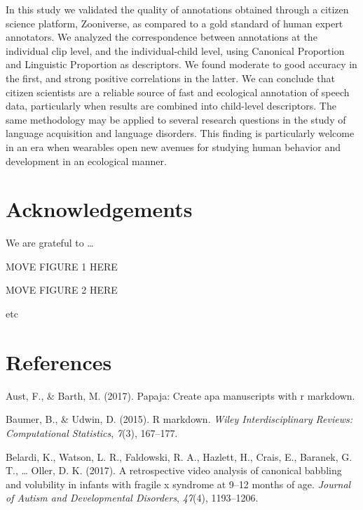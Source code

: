 \documentclass[english,,man,floatsintext]{apa6}
\begin{document}
In this study we validated the quality of annotations obtained through a citizen science platform, Zooniverse, as compared to a gold standard of human expert annotators. We analyzed the correspondence between annotations at the individual clip level, and the individual-child level, using Canonical Proportion and Linguistic Proportion as descriptors. We found moderate to good accuracy in the first, and strong positive correlations in the latter. We can conclude that citizen scientists are a reliable source of fast and ecological annotation of speech data, particularly when results are combined into child-level descriptors. The same methodology may be applied to several research questions in the study of language acquisition and language disorders. This finding is particularly welcome in an era when wearables open new avenues for studying human behavior and development in an ecological manner.

\newpage

\hypertarget{acknowledgements}{%
\section{Acknowledgements}\label{acknowledgements}}

We are grateful to \ldots{}

\newpage

MOVE FIGURE 1 HERE

\newpage

MOVE FIGURE 2 HERE

etc

\hypertarget{references}{%
\section{References}\label{references}}

\setlength{\parindent}{-0.5in}
\setlength{\leftskip}{0.5in}

\hypertarget{refs}{}
\leavevmode\hypertarget{ref-aust2017papaja}{}%
Aust, F., \& Barth, M. (2017). Papaja: Create apa manuscripts with r markdown.

\leavevmode\hypertarget{ref-baumer2015r}{}%
Baumer, B., \& Udwin, D. (2015). R markdown. \emph{Wiley Interdisciplinary Reviews: Computational Statistics}, \emph{7}(3), 167--177.

\leavevmode\hypertarget{ref-belardi2017retrospective}{}%
Belardi, K., Watson, L. R., Faldowski, R. A., Hazlett, H., Crais, E., Baranek, G. T., \ldots{} Oller, D. K. (2017). A retrospective video analysis of canonical babbling and volubility in infants with fragile x syndrome at 9--12 months of age. \emph{Journal of Autism and Developmental Disorders}, \emph{47}(4), 1193--1206.
\end{document}
